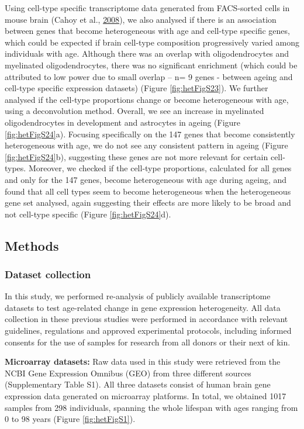 \documentclass[12pt,twoside]{unicam}
\begin{document}
Using cell-type specific transcriptome data generated from FACS-sorted cells in mouse brain (Cahoy et al., \protect\hyperlink{ref-Cahoy2008}{2008}), we also analysed if there is an association between genes that become heterogeneous with age and cell-type specific genes, which could be expected if brain cell-type composition progressively varied among individuals with age. Although there was an overlap with oligodendrocytes and myelinated oligodendrocytes, there was no significant enrichment (which could be attributed to low power due to small overlap -- n= 9 genes - between ageing and cell-type specific expression datasets) (Figure \ref{fig:hetFigS23}). We further analysed if the cell-type proportions change or become heterogeneous with age, using a deconvolution method. Overall, we see an increase in myelinated oligodendrocytes in development and astrocytes in ageing (Figure \ref{fig:hetFigS24}a). Focusing specifically on the 147 genes that become consistently heterogeneous with age, we do not see any consistent pattern in ageing (Figure \ref{fig:hetFigS24}b), suggesting these genes are not more relevant for certain cell-types. Moreover, we checked if the cell-type proportions, calculated for all genes and only for the 147 genes, become heterogeneous with age during ageing, and found that all cell types seem to become heterogeneous when the heterogeneous gene set analysed, again suggesting their effects are more likely to be broad and not cell-type specific (Figure \ref{fig:hetFigS24}d).

\hypertarget{hetMethods}{%
\subsection{Methods}\label{hetMethods}}

\hypertarget{hetDatasets}{%
\subsubsection{Dataset collection}\label{hetDatasets}}

In this study, we performed re-analysis of publicly available transcriptome datasets to test age-related change in gene expression heterogeneity. All data collection in these previous studies were performed in accordance with relevant guidelines, regulations and approved experimental protocols, including informed consents for the use of samples for research from all donors or their next of kin.

\textbf{Microarray datasets:} Raw data used in this study were retrieved from the NCBI Gene Expression Omnibus (GEO) from three different sources (Supplementary Table S1). All three datasets consist of human brain gene expression data generated on microarray platforms. In total, we obtained 1017 samples from 298 individuals, spanning the whole lifespan with ages ranging from 0 to 98 years (Figure \ref{fig:hetFigS1}).
\end{document}
